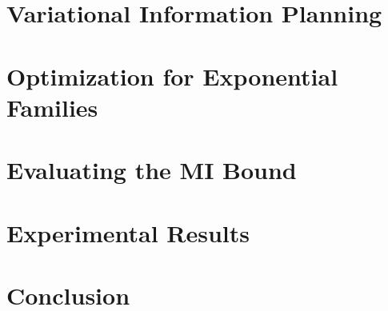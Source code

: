 \documentclass[twoside]{article}
\begin{document}
\section{Variational Information Planning}\label{sec:varplan}


\section{Optimization for Exponential Families}\label{sec:optim}


\section{Evaluating the MI Bound}


\section{Experimental Results}\label{sec:experiments}


\section{Conclusion}




\end{document}
